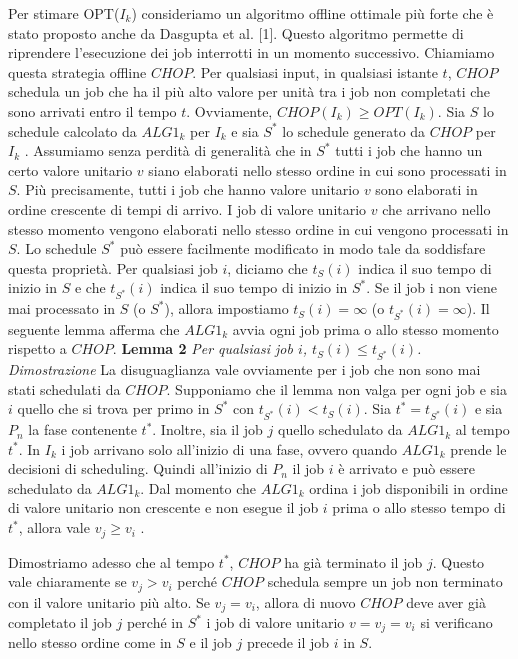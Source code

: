 \documentclass[12pt]{article}
\begin{document}
Per stimare OPT($I_{k}$) consideriamo un algoritmo offline ottimale più forte che è stato proposto anche da Dasgupta et al. [1]. Questo algoritmo permette di riprendere l'esecuzione dei job interrotti in un momento successivo. Chiamiamo questa strategia offline $CHOP$. Per qualsiasi input, in qualsiasi istante $t$, $CHOP$ schedula un job che ha il più alto valore per unità tra i job non completati che sono arrivati entro il tempo $t$. Ovviamente, $CHOP(I_{k}) \geq OPT(I_{k})$. Sia $S$ lo schedule calcolato da $ALG1_{k}$ per $I_{k}$ e sia $S^{*}$ lo schedule generato da $CHOP$ per $I_{k}$ . Assumiamo senza perdità di generalità che in $S^{*}$ tutti i job che hanno un certo valore unitario $v$ siano elaborati nello stesso ordine in cui sono processati in $S$. Più precisamente, tutti i job che hanno valore unitario $v$ sono elaborati in ordine crescente di tempi di arrivo. I job di valore unitario $v$ che arrivano nello stesso momento vengono elaborati nello stesso ordine in cui vengono processati in $S$. Lo schedule $S^{*}$ può essere facilmente modificato in modo tale da soddisfare questa proprietà. Per qualsiasi job $i$, diciamo che $t_{S}(i)$ indica il suo tempo di inizio in $S$ e che $t_{S^{*}}(i)$ indica il suo tempo di inizio in $S^{*}$. Se il job i non viene mai processato in $S$ (o $S^{*}$), allora impostiamo $t_{S}(i) = \infty$ (o $t_{S^{*}} (i) = \infty$). Il seguente lemma afferma che $ALG1_{k}$ avvia ogni job prima o allo stesso momento rispetto a $CHOP$.\newline\newline
\textbf{Lemma 2} 
\textit{Per qualsiasi job $i$, $t_{S}(i) \leq t_{S^{*}}(i)$.}\newline\newline
\textit{Dimostrazione}
La disuguaglianza vale ovviamente per i job che non sono mai stati schedulati da $CHOP$. Supponiamo che il lemma non valga per ogni job e sia $i$ quello che si trova per primo in $S^{*}$ con $t_{S^{*}}(i) < t_{S}(i)$. Sia $t^{*} = t_{S^{*}} (i)$ e sia $P_{n}$ la fase contenente $t^{*}$. Inoltre, sia il job $j$ quello schedulato da $ALG1_{k}$ al tempo $t^{*}$. In $I_{k}$ i job arrivano solo all'inizio di una fase, ovvero quando $ALG1_{k}$ prende le decisioni di scheduling. Quindi all'inizio di $P_{n}$ il job $i$ è arrivato e può essere schedulato da $ALG1_{k}$. Dal momento che $ALG1_{k}$ ordina i job disponibili in ordine di valore unitario non crescente e non esegue il job $i$ prima o allo stesso tempo di $t^{*}$, allora vale $v_{j} \geq v_{i}$ . 

Dimostriamo adesso che al tempo $t^{*}$, $CHOP$ ha già terminato il job $j$. Questo vale chiaramente se $v_{j} > v_{i}$ perché $CHOP$ schedula sempre un job non terminato con il valore unitario più alto. Se $v_{j} = v_{i}$, allora di nuovo $CHOP$ deve aver già completato il job $j$ perché in $S^{*}$ i job di valore unitario $v = v_{j} = v_{i}$ si verificano nello stesso ordine come in $S$ e il job $j$ precede il job $i$ in $S$. 
\end{document}

